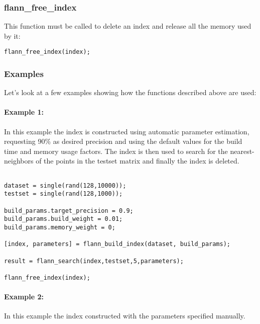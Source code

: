 \documentclass[letter,10pt]{article}
\begin{document}
\subsubsection{flann\_free\_index}

This function must be called to delete an index and release all the memory
used by it:
\begin{Verbatim}
flann_free_index(index);
\end{Verbatim}

\subsubsection{Examples}

Let's look at a few examples showing how the functions described above are
used:

\paragraph{Example 1:}

In this example the index is constructed using automatic parameter estimation, requesting 90\% as desired precision and using the default values for the build time and memory usage factors. The index is then used to search for the nearest-neighbors of the points in the testset matrix and finally the index is deleted.

\begin{Verbatim}[fontsize=\footnotesize,frame=single]

dataset = single(rand(128,10000));
testset = single(rand(128,1000));

build_params.target_precision = 0.9;
build_params.build_weight = 0.01;
build_params.memory_weight = 0;

[index, parameters] = flann_build_index(dataset, build_params);

result = flann_search(index,testset,5,parameters);

flann_free_index(index);

\end{Verbatim}




% 
% 


\paragraph{Example 2:}

In this example the index constructed with the parameters specified manually.
\end{document}
